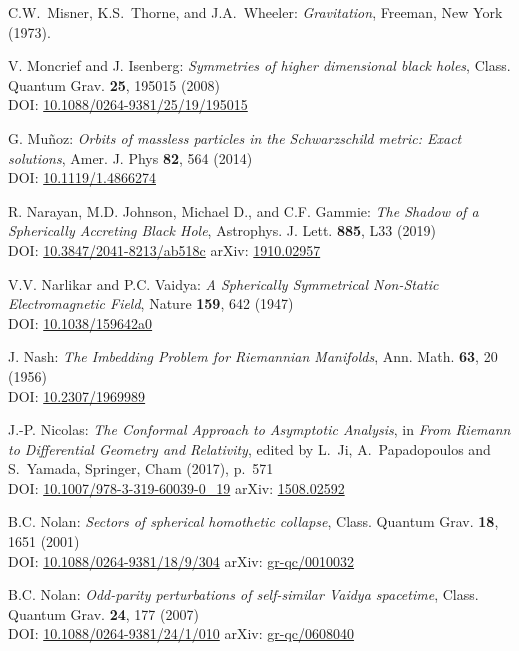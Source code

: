 \begin{thebibliography}{123}
C.W.~Misner, K.S.~Thorne, and J.A.~Wheeler: {\em Gravitation},
Freeman, New York (1973).

V. Moncrief and J. Isenberg:
{\em Symmetries of higher dimensional black holes},
Class. Quantum Grav. {\bf 25}, 195015 (2008)\\
DOI: \href{https://doi.org/10.1088/0264-9381/25/19/195015}{10.1088/0264-9381/25/19/195015}

G. Mu\~noz:
{\em Orbits of massless particles in the Schwarzschild metric: Exact solutions},
Amer. J. Phys {\bf 82}, 564 (2014)\\
DOI: \href{https://doi.org/10.1119/1.4866274}{10.1119/1.4866274}

R. Narayan, M.D. Johnson, Michael D., and C.F. Gammie:
{\em The Shadow of a Spherically Accreting Black Hole},
Astrophys. J. Lett. {\bf 885}, L33 (2019)\\
DOI: \href{https://doi.org/10.3847/2041-8213/ab518c}{10.3847/2041-8213/ab518c}\hfill
arXiv: \href{https://arxiv.org/abs/1910.02957}{1910.02957}

V.V. Narlikar and P.C. Vaidya:
{\em A Spherically Symmetrical Non-Static Electromagnetic Field},
Nature {\bf 159}, 642 (1947) \\
DOI: \href{https://doi.org/10.1038/159642a0}{10.1038/159642a0}

J. Nash:
{\em The Imbedding Problem for Riemannian Manifolds},
Ann. Math. {\bf 63}, 20 (1956)\\
DOI: \href{https://doi.org/10.2307/1969989}{10.2307/1969989}

J.-P. Nicolas:
{\em The Conformal Approach to Asymptotic Analysis},
in {\em From Riemann to Differential Geometry and Relativity},
edited by L.~Ji, A.~Papadopoulos and S.~Yamada, Springer, Cham (2017), p.~571\\
DOI: \href{https://doi.org/10.1007/978-3-319-60039-0_19}{10.1007/978-3-319-60039-0\_19}\hfill
arXiv: \href{https://arxiv.org/abs/1508.02592}{1508.02592}

B.C. Nolan:
{\em Sectors of spherical homothetic collapse},
Class. Quantum Grav. {\bf 18}, 1651 (2001)\\
DOI: \href{https://doi.org/10.1088/0264-9381/18/9/304}{10.1088/0264-9381/18/9/304}\hfill
arXiv: \href{https://arxiv.org/abs/gr-qc/0010032}{gr-qc/0010032}

B.C. Nolan:
{\em Odd-parity perturbations of self-similar Vaidya spacetime},
Class. Quantum Grav. {\bf 24}, 177 (2007)\\
DOI: \href{https://doi.org/10.1088/0264-9381/24/1/010}{10.1088/0264-9381/24/1/010}\hfill
arXiv: \href{https://arxiv.org/abs/gr-qc/0608040}{gr-qc/0608040}


\end{thebibliography}
